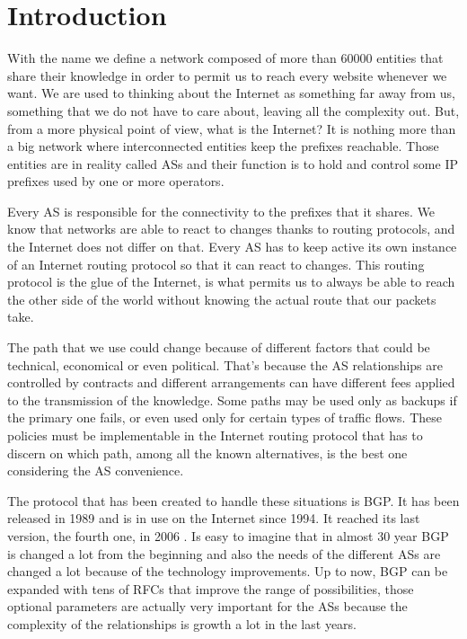 \chapter{Introduction}
\label{cha:introduction}



With the name  we define a network composed of more than \num{60000}
entities that share their knowledge in order to permit us to reach every website
whenever we want.
We are used to thinking about the Internet as something far away from us, something
that we do not have to care about, leaving all the complexity
out.
But, from a more physical point of view, what is the Internet? It is nothing
more than a big network where interconnected entities keep the prefixes  reachable.
Those entities are in reality called \acp{AS} and their function is to hold and
control some \ac{IP} prefixes used by one or more operators.

Every \ac{AS} is responsible for the connectivity to the prefixes that it shares.
We know that networks are able to react to changes thanks to routing protocols,
and the Internet does not differ on that.
Every \ac{AS} has to keep active its own instance of an Internet routing protocol
so that it can react to changes.
This routing protocol is the glue of the Internet, is what permits
us to always be able to reach the other side of the world without knowing
the actual route that our packets take.

The path that we use could change because of different factors that could
be technical, economical or even political.
That's because the \ac{AS} relationships are controlled by contracts and different
arrangements can have different fees applied to the transmission of the knowledge.
Some paths may be used only as backups if the primary one fails, or even used
only for certain types of traffic flows.
These policies must be implementable in the Internet routing protocol that has
to discern on which path, among all the known alternatives, is the best one
considering the \ac{AS} convenience.

The protocol that has been created  to handle these situations is  \ac{BGP}.
It has been released in \num{1989} and is in use on the Internet since \num{1994}.
It reached its last version, the fourth one, in \num{2006} \cite{rfc4271}.
Is easy to imagine that in almost \num{30} year \ac{BGP} is changed a lot from
the beginning and also the needs of the different \acp{AS} are changed a lot
because of the technology improvements.
Up to now, \ac{BGP} can be expanded with tens of \acp{RFC} that improve the
range of possibilities, those optional parameters are actually very important
for the \acp{AS} because the complexity of the relationships is growth a lot
in the last years.

